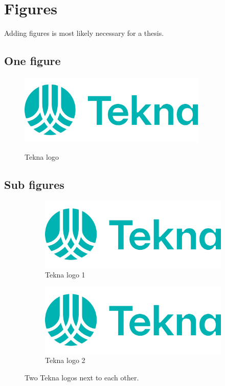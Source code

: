 \chapter{Figures}

Adding figures is most likely necessary for a thesis.

\section{One figure}
\begin{figure}[h]
    \centering
    \caption{Tekna logo}
    \includegraphics[width=0.8\textwidth]{hovedlogo.png}
    \label{fig:TeknaLogo}
\end{figure}

\newpage
\section{Sub figures}
\begin{figure}[h]
	\centering
	\begin{subfigure}[b]{0.35\textwidth}
		\includegraphics[width=\textwidth]{hovedlogo.png}
		\caption{Tekna logo 1}
		\label{fig:TeknaLogo1}
	\end{subfigure}
	\qquad
	\begin{subfigure}[b]{0.35\textwidth}
		\includegraphics[width=\textwidth]{hovedlogo.png}
		\caption{Tekna logo 2}
        \label{fig:TeknaLogo2}
	\end{subfigure}
	\caption{Two Tekna logos next to each other.}
    \label{fig:TeknaLogos}
\end{figure}
